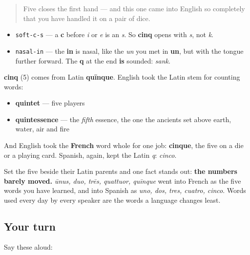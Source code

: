 \begin{quote}
Five closes the first hand — and this one came into English so completely that you have handled it on a pair of dice.
\end{quote}

\begin{sounds}
\begin{itemize}
\raggedright
  \item \texttt{soft-c-s} — a \textbf{c} before \emph{i} or \emph{e} is an \emph{s}. So \textbf{cinq} opens with \emph{s}, not \emph{k}.
  \item \texttt{nasal-in} — the \textbf{in} is nasal, like the \emph{un} you met in \textbf{un}, but with the tongue further forward. The \textbf{q} at the end \textbf{is} sounded: \emph{sank}.
\end{itemize}
\end{sounds}

\begin{cousinweb}
\textbf{cinq} (5) comes from Latin \textbf{quīnque}. English took the Latin stem for counting words:

\begin{itemize}
\raggedright
  \item \textbf{quintet} — five players
  \item \textbf{quintessence} — the \emph{fifth} essence, the one the ancients set above earth, water, air and fire
\end{itemize}

And English took the \textbf{French} word whole for one job: \textbf{cinque}, the five on a die or a playing card. Spanish, again, kept the Latin \emph{q}: \emph{cinco}.
\end{cousinweb}

\begin{grammarlens}[title={Grammar Lens: what the first five have in common}]
Set the five beside their Latin parents and one fact stands out: \textbf{the numbers barely moved.} \emph{ūnus, duo, trēs, quattuor, quīnque} went into French as the five words you have learned, and into Spanish as \emph{uno, dos, tres, cuatro, cinco}. Words used every day by every speaker are the words a language changes least.
\end{grammarlens}

\subsection*{Your turn}
Say these aloud:

